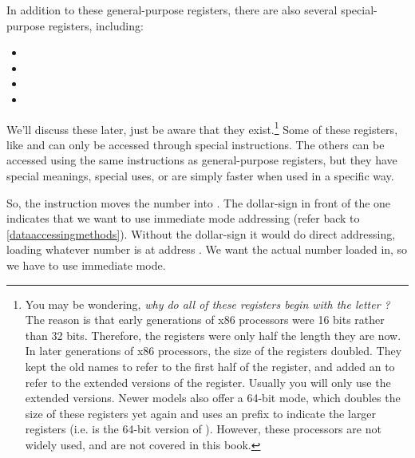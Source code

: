 In addition to these general-purpose registers,
there are also several special-purpose registers, including:

\begin{itemize}\item {\ebpRegIdx} 
\item {\espRegIdx} 
\item {\eipRegIdx} 
\item {\eflagsRegIdx} 
\end{itemize}

We'll discuss these later, just be aware that they 
exist.\footnote{You may be wondering, \emph{why do all of these
registers begin with the letter ?}  The
reason is that early generations of x86 processors were 16 bits 
rather than 32 bits.
Therefore, the registers were only half the length
they are now.  In later generations of x86 processors, the size of the 
registers doubled. They kept
the old names to refer to the first half of the register, and added an
 to refer to the extended versions of the register.
Usually you will only use the extended versions.  Newer models also
offer a 64-bit mode, which doubles the size of these registers yet again
and uses an  prefix to indicate the larger registers (i.e.
{\raxReg} is the 64-bit version of {\eaxReg}).  However, these processors are not 
widely used, and are not covered in this book.
}  Some of these registers, like {\eipRegIdx} and {\eflagsRegIdx} can
only be accessed through special instructions.  The others can be accessed
using the same instructions as general-purpose registers, but they have 
special meanings, special uses, or are simply faster when used in a specific
way.

So, the  instruction moves the number 
 into \icode{{\eaxBare}}.  The 
dollar-sign in front of the one indicates that we want to use 
immediate mode addressing (refer back to \autoref{dataaccessingmethods}).  Without the dollar-sign it would do direct addressing,
loading whatever number is at address .  We want the
actual number  loaded in, so we have to use immediate
mode.  


